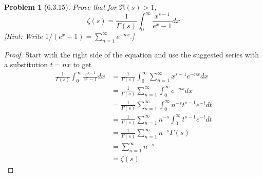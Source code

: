 \documentclass[10pt]{article}
\newcommand{\sk}{\vskip 10mm}
\theoremstyle{plain}
\newtheorem{problem}{Problem}
\theoremstyle{remark}
\begin{document}
\sk

\begin{problem}[6.3.15]
  Prove that for $\Re(s)>1$,
  \[
    \zeta(s)=\frac{1}{\Gamma(s)}\int_0^\infty\frac{x^{s-1}}{e^x-1}dx
  \]
  [Hint: Write $1/(e^x-1)=\sum_{n=1}^\infty e^{-nx}$.]
\end{problem}

\begin{proof}
  Start with the right side of the equation and use the suggested series
  with a substitution $t=nx$ to get
  \begin{align*}
    \frac{1}{\Gamma(s)}\int_0^\infty \frac{x^{s-1}}{e^x-1}dx &= \frac{1}{\Gamma(s)}\int_0^\infty\sum_{n=1}^\infty x^{s-1}e^{-nx}dx\\
                                                &=\frac{1}{\Gamma(s)}\sum_{n=1}^\infty \int_0^\infty e^{-nx}dx\\
                                                &=\frac{1}{\Gamma(s)}\sum_{n=1}^\infty \int_0^\infty n^{-s}t^{s-1}e^{-t}dt\\
                                                &=\frac{1}{\Gamma(s)}\sum_{n=1}^\infty n^{-s}\int_0^\infty t^{s-1}e^{-t}dt\\
                                                &=\frac{1}{\Gamma(s)}\sum_{n=1}^\infty n^{-s}\Gamma(s)\\
                                                &=\sum_{n=1}^\infty n^{-s}\\
                                                &= \zeta(s)
  \end{align*}
\end{proof}

\end{document}
